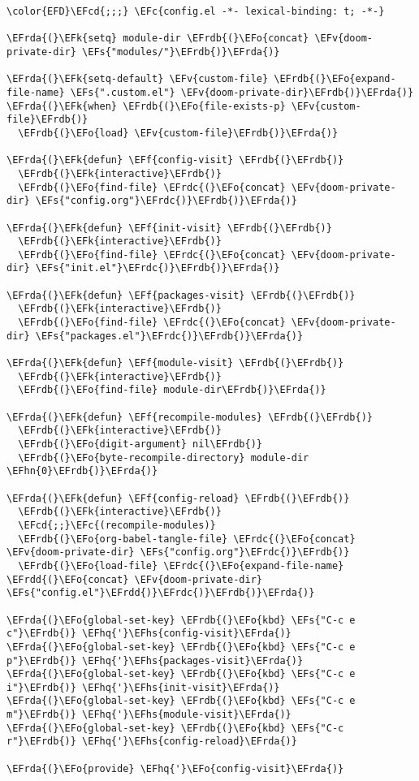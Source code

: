 \documentclass[a4wide,10pt]{article}
\newcommand{\EFc}[1]{\textcolor{EFc}{#1}} %
\newcommand{\EFcd}[1]{\textcolor{EFcd}{#1}} %
\newcommand{\EFs}[1]{\textcolor{EFs}{#1}} %
\newcommand{\EFk}[1]{\textcolor{EFk}{#1}} %
\newcommand{\EFf}[1]{\textcolor{EFf}{#1}} %
\newcommand{\EFv}[1]{\textcolor{EFv}{#1}} %
\newcommand{\EFo}[1]{\textcolor{EFo}{#1}} %
\newcommand{\EFhn}[1]{\textcolor{EFhn}{\textbf{#1}}} %
\newcommand{\EFhq}[1]{\textcolor{EFhq}{#1}} %
\newcommand{\EFhs}[1]{\textcolor{EFhs}{#1}} %
\newcommand{\EFrda}[1]{\textcolor{EFrda}{#1}} %
\newcommand{\EFrdb}[1]{\textcolor{EFrdb}{#1}} %
\newcommand{\EFrdc}[1]{\textcolor{EFrdc}{#1}} %
\newcommand{\EFrdd}[1]{\textcolor{EFrdd}{#1}} %
\begin{document}
\begin{Code}
\begin{Verbatim}
\color{EFD}\EFcd{;;;} \EFc{config.el -*- lexical-binding: t; -*-}

\EFrda{(}\EFk{setq} module-dir \EFrdb{(}\EFo{concat} \EFv{doom-private-dir} \EFs{"modules/"}\EFrdb{)}\EFrda{)}

\EFrda{(}\EFk{setq-default} \EFv{custom-file} \EFrdb{(}\EFo{expand-file-name} \EFs{".custom.el"} \EFv{doom-private-dir}\EFrdb{)}\EFrda{)}
\EFrda{(}\EFk{when} \EFrdb{(}\EFo{file-exists-p} \EFv{custom-file}\EFrdb{)}
  \EFrdb{(}\EFo{load} \EFv{custom-file}\EFrdb{)}\EFrda{)}

\EFrda{(}\EFk{defun} \EFf{config-visit} \EFrdb{(}\EFrdb{)}
  \EFrdb{(}\EFk{interactive}\EFrdb{)}
  \EFrdb{(}\EFo{find-file} \EFrdc{(}\EFo{concat} \EFv{doom-private-dir} \EFs{"config.org"}\EFrdc{)}\EFrdb{)}\EFrda{)}

\EFrda{(}\EFk{defun} \EFf{init-visit} \EFrdb{(}\EFrdb{)}
  \EFrdb{(}\EFk{interactive}\EFrdb{)}
  \EFrdb{(}\EFo{find-file} \EFrdc{(}\EFo{concat} \EFv{doom-private-dir} \EFs{"init.el"}\EFrdc{)}\EFrdb{)}\EFrda{)}

\EFrda{(}\EFk{defun} \EFf{packages-visit} \EFrdb{(}\EFrdb{)}
  \EFrdb{(}\EFk{interactive}\EFrdb{)}
  \EFrdb{(}\EFo{find-file} \EFrdc{(}\EFo{concat} \EFv{doom-private-dir} \EFs{"packages.el"}\EFrdc{)}\EFrdb{)}\EFrda{)}

\EFrda{(}\EFk{defun} \EFf{module-visit} \EFrdb{(}\EFrdb{)}
  \EFrdb{(}\EFk{interactive}\EFrdb{)}
  \EFrdb{(}\EFo{find-file} module-dir\EFrdb{)}\EFrda{)}

\EFrda{(}\EFk{defun} \EFf{recompile-modules} \EFrdb{(}\EFrdb{)}
  \EFrdb{(}\EFk{interactive}\EFrdb{)}
  \EFrdb{(}\EFo{digit-argument} nil\EFrdb{)}
  \EFrdb{(}\EFo{byte-recompile-directory} module-dir \EFhn{0}\EFrdb{)}\EFrda{)}

\EFrda{(}\EFk{defun} \EFf{config-reload} \EFrdb{(}\EFrdb{)}
  \EFrdb{(}\EFk{interactive}\EFrdb{)}
  \EFcd{;;}\EFc{(recompile-modules)}
  \EFrdb{(}\EFo{org-babel-tangle-file} \EFrdc{(}\EFo{concat} \EFv{doom-private-dir} \EFs{"config.org"}\EFrdc{)}\EFrdb{)}
  \EFrdb{(}\EFo{load-file} \EFrdc{(}\EFo{expand-file-name} \EFrdd{(}\EFo{concat} \EFv{doom-private-dir} \EFs{"config.el"}\EFrdd{)}\EFrdc{)}\EFrdb{)}\EFrda{)}

\EFrda{(}\EFo{global-set-key} \EFrdb{(}\EFo{kbd} \EFs{"C-c e c"}\EFrdb{)} \EFhq{'}\EFhs{config-visit}\EFrda{)}
\EFrda{(}\EFo{global-set-key} \EFrdb{(}\EFo{kbd} \EFs{"C-c e p"}\EFrdb{)} \EFhq{'}\EFhs{packages-visit}\EFrda{)}
\EFrda{(}\EFo{global-set-key} \EFrdb{(}\EFo{kbd} \EFs{"C-c e i"}\EFrdb{)} \EFhq{'}\EFhs{init-visit}\EFrda{)}
\EFrda{(}\EFo{global-set-key} \EFrdb{(}\EFo{kbd} \EFs{"C-c e m"}\EFrdb{)} \EFhq{'}\EFhs{module-visit}\EFrda{)}
\EFrda{(}\EFo{global-set-key} \EFrdb{(}\EFo{kbd} \EFs{"C-c r"}\EFrdb{)} \EFhq{'}\EFhs{config-reload}\EFrda{)}

\EFrda{(}\EFo{provide} \EFhq{'}\EFo{config-visit}\EFrda{)}
\end{Verbatim}
\end{Code}
\end{document}
